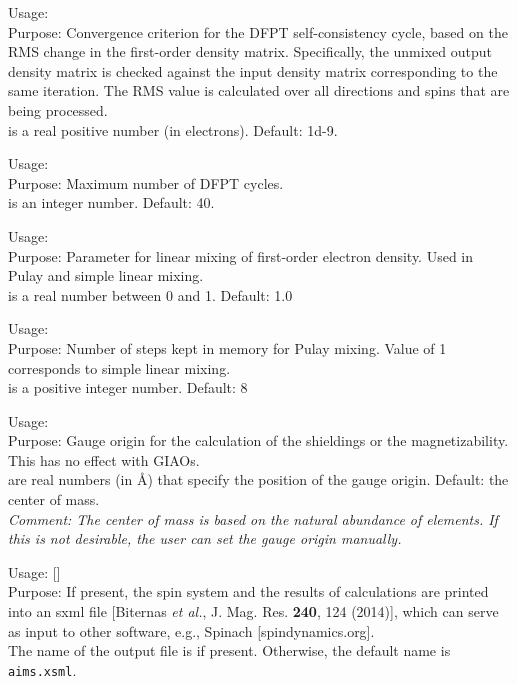 {
  \noindent
  Usage:  \\[1.0ex]
  Purpose: Convergence criterion for the DFPT self-consistency cycle, based on the RMS change in the first-order density matrix. Specifically, the unmixed output density matrix is checked against the input density matrix corresponding to the same iteration. The RMS value is calculated over all directions and spins that are being processed.\\[1.0ex]
   is a real positive number (in electrons). Default: 1d-9.
}

{
  \noindent
  Usage:  \\[1.0ex]
  Purpose: Maximum number of DFPT cycles.\\[1.0ex]
   is an integer number. Default: 40.
}

{
  \noindent
  Usage:  \\[1.0ex]
  Purpose: Parameter for linear mixing of first-order electron density. Used in Pulay and simple linear mixing.\\[1.0ex]
   is a real number between 0 and 1. Default: 1.0
}

{
  \noindent
  Usage:  \\[1.0ex]
  Purpose: Number of steps kept in memory for Pulay mixing. Value of 1 corresponds to simple linear mixing. \\[1.0ex]
   is a positive integer number. Default: 8
}

{
  \noindent
  Usage:  \\[1.0ex]
  Purpose: Gauge origin for the calculation of the shieldings or the magnetizability. This has no effect with GIAOs.\\[1.0ex]
   are real numbers (in \AA) that specify the position of the gauge origin. Default: the center of mass.\\[1.0ex]
  \textit{Comment: The center of mass is based on the natural abundance of elements. If this is not desirable, the user can set the gauge origin manually.}
}

{
  \noindent
  Usage:  []\\[1.0ex]
  Purpose: If present, the spin system and the results of calculations are printed into an sxml file [Biternas \textit{et al.}, J. Mag. Res. \textbf{240}, 124 (2014)], which can serve as input to other software, e.g., Spinach [spindynamics.org].\\[1.0ex]
  The name of the output file is  if present. Otherwise, the default name is \texttt{aims.xsml}.
}

